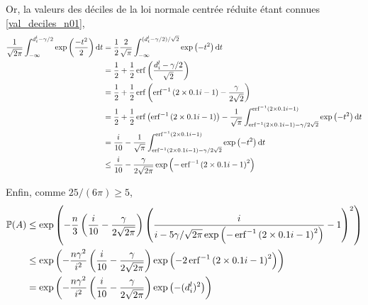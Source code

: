 Or, la valeurs des déciles de la loi normale centrée réduite étant connues \ref{val_deciles_n01},
\begin{align*}
    \dfrac{1}{\sqrt{2\pi}} \int_{-\infty}^{d^l_i - \gamma/2}   \exp\left( \dfrac{-t^2}{2} \right)\mathrm{d} t & = \dfrac{1}{2}\dfrac{2}{\sqrt{\pi}}  \int_{-\infty}^{(d^l_i - \gamma/2)/\sqrt 2}   \exp\left( {-t^2} \right)\mathrm{d} t\\
    & = \dfrac{1}{2} + \dfrac{1}{2}\operatorname{erf}\left( \dfrac{d^l_i - \gamma/2}{\sqrt 2 }\right)\\
    & = \dfrac{1}{2} + \dfrac{1}{2}\operatorname{erf}\left( \operatorname{erf}^{-1}\left( 2\times 0.1i - 1 \right) - \dfrac{\gamma}{2\sqrt 2 }\right)\\
    & = \dfrac{1}{2} + \dfrac{1}{2}\operatorname{erf}\left( \operatorname{erf}^{-1}\left( 2\times 0.1i - 1 \right)\right) - \dfrac{1}{\sqrt{\pi}}\int_{\operatorname{erf}^{-1}\left( 2\times 0.1i - 1 \right) - \gamma/2\sqrt 2}^{\operatorname{erf}^{-1}\left( 2\times 0.1i - 1 \right)} \exp\left( -t^2 \right)\mathrm{d} t\\
    & = \dfrac{i}{10} - \dfrac{1}{\sqrt{\pi}}\int_{\operatorname{erf}^{-1}\left( 2\times 0.1i - 1 \right) - \gamma/2\sqrt 2}^{\operatorname{erf}^{-1}\left( 2\times 0.1i - 1 \right)} \exp\left( -t^2 \right)\mathrm{d} t\\
    & \leq \dfrac{i}{10} - \dfrac{\gamma}{2\sqrt{2\pi}} \exp\left( - \operatorname{erf}^{-1}\left(2\times 0.1i - 1 \right)^2\right) \\
\end{align*}

Enfin, comme \(25/(6\pi) \geq 5\),
\begin{align*}
    \mathbb P(A) & \leq \exp\left( - \dfrac{n}{3} \left( \dfrac{i}{10} - \dfrac{\gamma}{2\sqrt{2\pi}}\right)\left( \dfrac{i}{i - {5\gamma}/{\sqrt{2\pi}} \exp\left( - \operatorname{erf}^{-1}\left(2\times 0.1i - 1 \right)^2\right)}  - 1 \right)^2\right)\\
    & \leq \exp\left( - \dfrac{n\gamma^2}{i^2} \left( \dfrac{i}{10} - \dfrac{\gamma}{2\sqrt{2\pi}}\right)\exp\left( - 2\operatorname{erf}^{-1}\left(2\times 0.1i - 1 \right)^2\right)\right)\\
    & = \exp\left( - \dfrac{n\gamma^2}{i^2} \left( \dfrac{i}{10} - \dfrac{\gamma}{2\sqrt{2\pi}}\right)\exp\left( - (d_i^l)^2\right)\right)
\end{align*}

